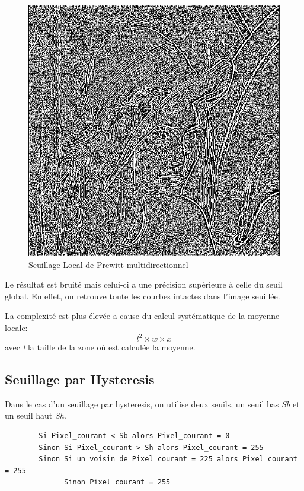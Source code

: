 \documentclass[11pt]{article}
\begin{document}
	\begin{figure}[H]
		\centering
		\includegraphics[scale=0.25]{Image/seuilLocal.png}
		\caption{Seuillage Local de Prewitt multidirectionnel}
		\label{fig:seuilLocal}
	\end{figure} 

	Le résultat est  bruité mais celui-ci a une précision supérieure à celle du seuil global. 
	En effet, on retrouve toute les courbes intactes dans l'image seuillée.

	La complexité est plus élevée a cause du calcul systématique de la moyenne locale: \[l^2 \times w \times x\]
	avec \textit{l} la taille de la zone où est calculée la moyenne.

	\subsection{Seuillage par Hysteresis}\label{hysteresis}

	Dans le cas d'un seuillage par hysteresis, on utilise deux seuils, un seuil bas \textit{Sb} et un seuil haut \textit{Sh}.

	\begin{verbatim}
		Si Pixel_courant < Sb alors Pixel_courant = 0
		Sinon Si Pixel_courant > Sh alors Pixel_courant = 255
		Sinon Si un voisin de Pixel_courant = 225 alors Pixel_courant = 255
		      Sinon Pixel_courant = 255
	\end{verbatim}
\end{document}

